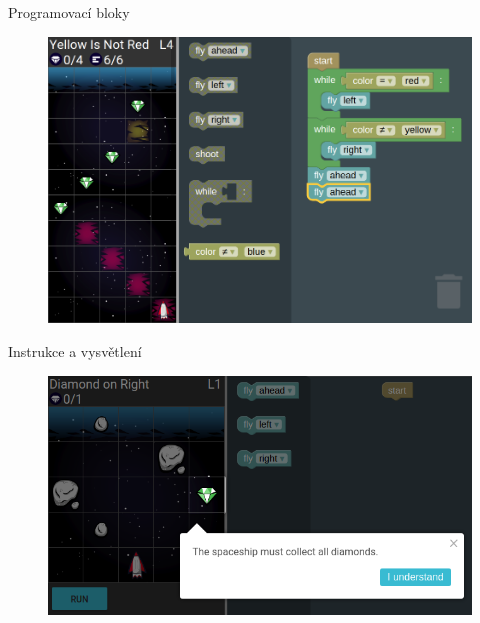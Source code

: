 \documentclass[
]{beamer}
\begin{document}
\begin{frame}{Programovací bloky}
\begin{figure}
\includegraphics[width=\textwidth,height=.65\textheight,keepaspectratio]{../img/robomission-yellow-is-not-red-whiles}
\end{figure}
\end{frame}

\begin{frame}{Instrukce a vysvětlení}
\begin{figure}
\includegraphics[width=\textwidth,height=.65\textheight,keepaspectratio]{../img/robomission-mini-instruction}
\end{figure}
\end{frame}
\end{document}
